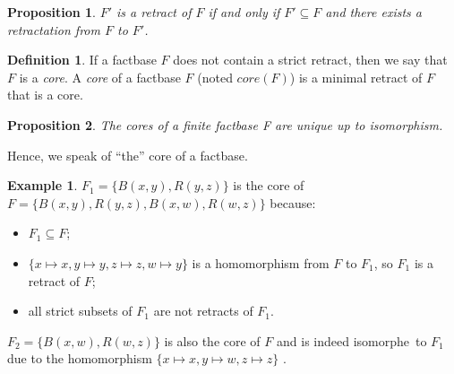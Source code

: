 \documentclass{article}
\newtheorem{proposition}{Proposition}[section]
\theoremstyle{definition}
\newtheorem{definition}{Definition}[section]
\newtheorem{example}{Example}[section]
\theoremstyle{remark}
\begin{document}
\begin{proposition}
$F'$ is a retract of $F$ if and only if $F' \subseteq F$  and there exists a retractation from $F$ to $F'$.
\end{proposition}

\begin{definition}
If a factbase $F$ does not contain a strict retract, then we say that $F$ is a \emph{core}. A \emph{core} of a factbase $F$ (noted \emph{$\textit{core}(F)$}) is a minimal retract of $F$ that is a core.
\end{definition}

\begin{proposition}
The cores of a finite factbase F are unique up to isomorphism.
\end{proposition}

Hence, we speak of ``the'' core of a factbase.

\begin{example}
$F_1 = \{B(x,y),R(y,z)\}$ is the core of $F = \{B(x,y),R(y,z),B(x,w),R(w,z)\}$ because:
\begin{itemize}
\item $F_1 \subseteq F$;
\item $\{x \mapsto x, y \mapsto y, z \mapsto z, w \mapsto y\}$ is a homomorphism from $F$ to $F_1$, so $F_1$ is a retract of $F$;
\item all strict subsets of $F_1$ are not retracts of $F_1$.
\end{itemize}
$F_2 = \{B(x,w),R(w,z)\}$ is also the core of $F$ and is indeed isomorphe\ to $F_1$ due to the homomorphism $\{x \mapsto x, y \mapsto w, z \mapsto z\}$ .
\end{example}

\end{document}
